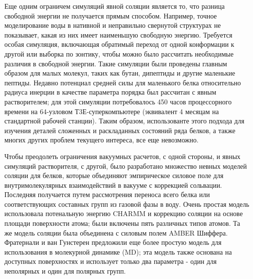 Еще одним ограничем симуляций явной соляции является то, что разница свободной энергии не получается прямым способом. Например, точное моделирование воды в нативной и неправильно свернутой структурах не показывает, какая из них имеет наименьшую свободную энергию. Требуется особая симуляция, включающая обратимый переход от одной конформации к другой или выборка по зонтику, чтобы можно было рассчитать необходимые различия в свободной энергии. Такие симуляции были проведены главным образом для малых молекул, таких как бутан, дипептиды и другие маленькие пептиды. Недавно потенциал средней силы для маленького белка относительно радиуса инерции в качестве параметра порядка был рассчитан с явным растворителем; для этой симуляции потребовалось 450 часов процессорного времени на 64-узловом Т3Е-суперкомпьютере (эквивалент 4 месяцам на стандартной рабочей станции). Таким образом, использованте этого подхода для изучения деталей сложенных и раскладанных состояний ряда белков, а также многих других проблем текущего интереса, все еще невозможно. 

Чтобы преодолеть ограничения вакуумных расчетов, с одной стороны, и явных симуляций растворителя, с другой, было разработано множество невных моделей соляции для белков, которые объединяют эмпирическое силовое поле для внутримолекулярных взаимодействий в вакууме с коррекцией сольвации. Последняя получается путем рассмотрения переноса всего белка или соответствующих составных групп из газовой фазы в воду. Очень простая модель использовала потенальную энергию CHARMM и коррекцию соляции на основе площади поверхности атома; были включены пять различных типов атомов. Та же модель соляции была объединена с силовым полем AMBER Шиффера. Фратернали и ван Гунстерен предложили еще более простую модель для использования в молекурной динамике (MD); эта модель также основана на доступных поверхностях и использует только два параметра - один для неполярных и один для полярных групп.

